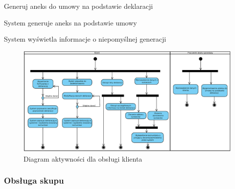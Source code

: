 	\begin{usecase}{Generuj aneks do umowy na podstawie deklaracji}
		\author{Dawid Suder}
		\maketitle
		\begin{scenario}
			\begin{enumerate}
				 System generuje aneks na podstawie umowy
			\end{enumerate}
		\end{scenario}
		\begin{extensions}
			\begin{enumerate}
			 System wyświetla informacje o niepomyślnej generacji
			\end{enumerate}
		\end{extensions}
\end{usecase}

	\begin{figure}[H]
		\centering
		\includegraphics[width=.9\textwidth]{img/AD/klient.eps}
		\caption{Diagram aktywności dla obsługi klienta}
	\end{figure}

\subsubsection{Obsługa skupu}

